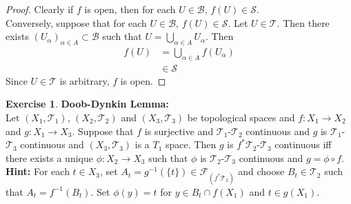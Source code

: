 \documentclass[12pt]{amsart}
\theoremstyle{definition}
\newtheorem{ex}[definition]{Exercise}
\newcommand{\al}{\alpha}
\newcommand{\MB}{\mathcal{B}}
\newcommand{\MF}{\mathcal{F}}
\newcommand{\MS}{\mathcal{S}}
\newcommand{\MT}{\mathcal{T}}
\newcommand{\lex}[1]{\label{ex:#1}}
\begin{document}
	\begin{proof}
		Clearly if $f$ is open, then for each $U \in \MB$, $f(U) \in \MS$.\\
		Conversely, suppose that for each $U \in \MB$, $f(U) \in \MS$. Let $U \in \MT$. Then there exists $(U_{\al})_{\al \in A} \subset \MB$ such that $U =  \bigcup\limits_{\al \in A} U_{\al}$. Then 
		\begin{align*}
			f(U) 
			& = \bigcup\limits_{\al \in A} f(U_{\al}) \\
			& \in \MS
		\end{align*}
		Since $U \in \MT$ is arbitrary, $f$ is open.
	\end{proof}
	
	\begin{ex}\lex{} \textbf{Doob-Dynkin Lemma:} \\
	Let $(X_1, \MT_1)$, $(X_2, \MT_2)$ and $(X_3, \MT_3)$ be topological spaces and $f: X_1 \rightarrow X_2$ and $g:X_1 \rightarrow X_3$. Suppose that $f$ is surjective and $\MT_1$-$\MT_2$ continuous and $g$ is $\MT_1$-$\MT_3$ continuous and $(X_3, \MT_3)$ is a $T_1$ space. Then $g$ is $f^*\MT_2$-$\MT_3$ continuous iff there exists a unique $\phi: X_2 \rightarrow X_3$ such that $\phi$ is $\MT_2$-$\MT_3$ continuous and $g = \phi \circ f$. \\
	\textbf{Hint:} For each $t \in X_3$, set $A_t = g^{-1}(\{t\}) \in \MF_{(f^* \MT_2)}$ and choose $B_t \in \MT_2$ such that $A_t = f^{-1}(B_t)$. Set $\phi(y) = t$ for $y \in B_t \cap f(X_1)$ and $t \in g(X_1)$.
	\end{ex}
	
\end{document}
